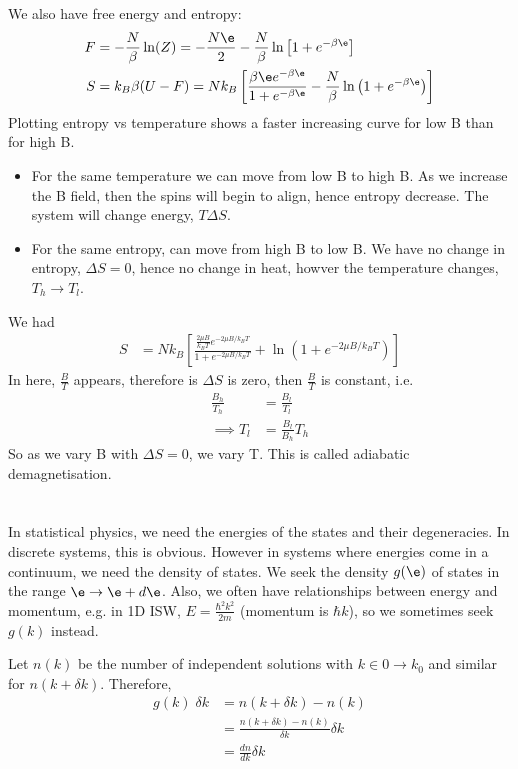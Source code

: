 \documentclass[a4paper, 11pt, normalem]{report}
\begin{document}
We also have free energy and entropy:
\begin{align}
    F &= -\frac{N}{\beta}\ln(Z) = -\frac{N\e}{2} - \frac{N}{\beta}\ln\left[1 + e^{-\beta\e}\right] \\
    S &= k_B\beta (U - F) = Nk_B\left[\frac{\beta\e e^{-\beta\e}}{1 + e^{-\beta\e}} - \frac{N}{\beta}\ln\left(1 + e^{-\beta\e}\right)\right]
\end{align}
Plotting entropy vs temperature shows a faster increasing curve for low B than for high B. 
\begin{itemize}
    \item For the same temperature we can move from low B to high B.
        As we increase the B field, then the spins will begin to align, hence entropy decrease.
        The system will change energy, $T\Delta S$.
    \item For the same entropy, can move from high B to low B. 
        We have no change in entropy, $\Delta S = 0$, hence no change in heat, howver the temperature changes, $T_h \to T_l$.
\end{itemize}

We had 
\begin{align}
    S &= Nk_B\left[\frac{\frac{2\mu B}{k_B T}e^{-2\mu B/k_BT}}{1 + e^{-2\mu B/k_BT}} + \ln\left(1 + e^{-2\mu B/k_BT}\right)\right]
\end{align}
In here, $\frac{B}{T}$ appears, therefore is $\Delta S$ is zero, then $\frac{B}{T}$ is constant, i.e.
\begin{align}
    \frac{B_h}{T_h} &= \frac{B_l}{T_l} \\
    \implies T_l &= \frac{B_l}{B_h}T_h
\end{align}
So as we vary B with $\Delta S = 0$, we vary T.
This is called adiabatic demagnetisation.

\chapter{}
In statistical physics, we need the energies of the states and their degeneracies.
In discrete systems, this is obvious.
However in systems where energies come in a continuum, we need the density of states. 
We seek the density $g(\e)$ of states in the range $\e \to \e+d\e$. 
Also, we often have relationships between energy and momentum, e.g. in 1D ISW, $E = \frac{\hbar^2k^2}{2m}$ (momentum is $\hbar k$), so we sometimes seek $g(k)$ instead.

Let $n(k)$ be the number of independent solutions with $k \in 0 \to k_0$ and similar for $n(k+\delta k)$.
Therefore, 
\begin{align}
    g(k)\;\delta k &= n(k+\delta k) - n(k) \\
                   &= \frac{n(k+\delta k) - n(k)}{\delta k}\delta k \\
                   &= \frac{dn}{dk}\delta k
\end{align}
\end{document}
